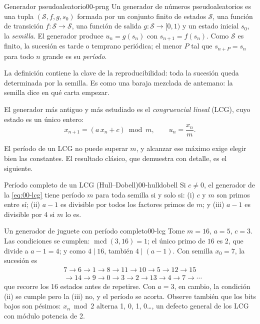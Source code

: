 \begin{definicion}{Generador pseudoaleatorio}{00-prng}
Un generador de números pseudoaleatorios es una tupla $(\mathcal{S}, f, g, s_0)$ formada por un conjunto finito de estados $\mathcal{S}$, una función de transición $f:\mathcal{S}\to\mathcal{S}$, una función de salida $g:\mathcal{S}\to[0,1)$ y un estado inicial $s_0$, la \emph{semilla}. El generador produce $u_n = g(s_n)$ con $s_{n+1}=f(s_n)$. Como $\mathcal{S}$ es finito, la sucesión es tarde o temprano periódica; el menor $P$ tal que $s_{n+P}=s_n$ para todo $n$ grande es su \emph{período}.
\end{definicion}

La definición contiene la clave de la reproducibilidad: toda la sucesión queda determinada por la semilla. Es como una baraja mezclada de antemano: la semilla dice en qué carta empezar.

El generador más antiguo y más estudiado es el \emph{congruencial lineal} (LCG), cuyo estado es un único entero:
\begin{equation}\label{eq:00-lcg}
x_{n+1} = (a\,x_n + c) \bmod m, \qquad u_n = \frac{x_n}{m}.
\end{equation}

\begin{simbolos}
\simbolo{$u_n$}{Número pseudoaleatorio en $[0,1)$ que se entrega al usuario.}
\end{simbolos}

El período de un LCG no puede superar $m$, y alcanzar ese máximo exige elegir bien las constantes. El resultado clásico, que \textcite{c00-knuth1997} demuestra con detalle, es el siguiente.

\begin{teorema}{Período completo de un LCG (Hull--Dobell)}{00-hulldobell}
Si $c\neq0$, el generador de la \cref{eq:00-lcg} tiene período $m$ para toda semilla si y solo si: (i) $c$ y $m$ son primos entre sí; (ii) $a-1$ es divisible por todos los factores primos de $m$; y (iii) $a-1$ es divisible por 4 si $m$ lo es.
\end{teorema}

\begin{ejemplo}{Un generador de juguete con período completo}{00-lcg}
Tome $m=16$, $a=5$, $c=3$. Las condiciones se cumplen: $\operatorname{mcd}(3,16)=1$; el único primo de $16$ es 2, que divide a $a-1=4$; y como $4\mid16$, también $4\mid(a-1)$. Con semilla $x_0=7$, la sucesión es
\[
\begin{aligned}&7\to6\to1\to8\to11\to10\to5\to12\to15\\ &\to14\to9\to0\to3\to2\to13\to4\to7\to\cdots\end{aligned}
\]
que recorre los 16 estados antes de repetirse. Con $a=3$, en cambio, la condición (ii) se cumple pero la (iii) no, y el período se acorta. Observe también que los bits bajos son pésimos: $x_n \bmod 2$ alterna 1, 0, 1, 0\ldots, un defecto general de los LCG con módulo potencia de 2.
\end{ejemplo}


